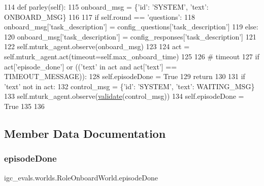 \begin{DoxyCode}
114     \textcolor{keyword}{def }parley(self):
115         onboard\_msg = \{\textcolor{stringliteral}{'id'}: \textcolor{stringliteral}{'SYSTEM'}, \textcolor{stringliteral}{'text'}: ONBOARD\_MSG\}
116 
117         \textcolor{keywordflow}{if} self.round == \textcolor{stringliteral}{'questions'}:
118             onboard\_msg[\textcolor{stringliteral}{'task\_description'}] = config\_questions[\textcolor{stringliteral}{'task\_description'}]
119         \textcolor{keywordflow}{else}:
120             onboard\_msg[\textcolor{stringliteral}{'task\_description'}] = config\_responses[\textcolor{stringliteral}{'task\_description'}]
121 
122         self.mturk\_agent.observe(onboard\_msg)
123 
124         act = self.mturk\_agent.act(timeout=self.max\_onboard\_time)
125 
126         \textcolor{comment}{# timeout}
127         \textcolor{keywordflow}{if} act[\textcolor{stringliteral}{'episode\_done'}] \textcolor{keywordflow}{or} ((\textcolor{stringliteral}{'text'} \textcolor{keywordflow}{in} act \textcolor{keywordflow}{and} act[\textcolor{stringliteral}{'text'}] == TIMEOUT\_MESSAGE)):
128             self.episodeDone = \textcolor{keyword}{True}
129             \textcolor{keywordflow}{return}
130 
131         \textcolor{keywordflow}{if} \textcolor{stringliteral}{'text'} \textcolor{keywordflow}{not} \textcolor{keywordflow}{in} act:
132             control\_msg = \{\textcolor{stringliteral}{'id'}: \textcolor{stringliteral}{'SYSTEM'}, \textcolor{stringliteral}{'text'}: WAITING\_MSG\}
133             self.mturk\_agent.observe(\hyperlink{namespaceparlai_1_1core_1_1worlds_afc3fad603b7bce41dbdc9cdc04a9c794}{validate}(control\_msg))
134             self.episodeDone = \textcolor{keyword}{True}
135 
136 
\end{DoxyCode}


\subsection{Member Data Documentation}
\mbox{\label{classigc__evals_1_1worlds_1_1RoleOnboardWorld_a5746dc1a7d35c4a525c8fd2f5f20e149}} 
\subsubsection{\texorpdfstring{episode\+Done}{episodeDone}}
{\footnotesize\ttfamily igc\+\_\+evals.\+worlds.\+Role\+Onboard\+World.\+episode\+Done}



